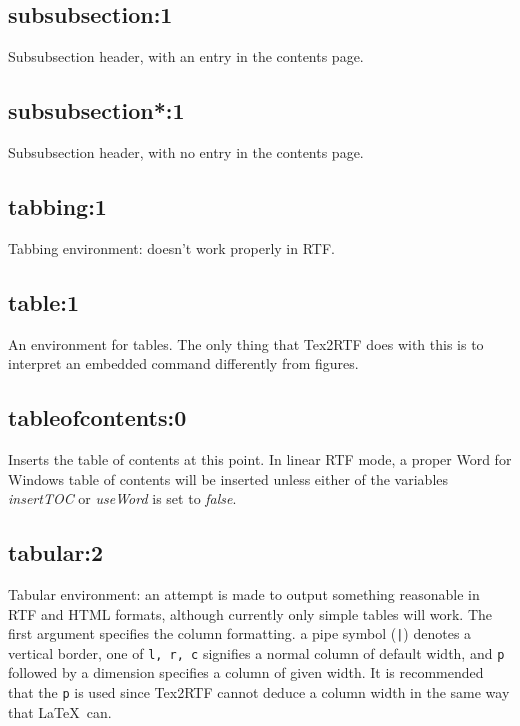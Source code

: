 \subsection*{subsubsection:1}\label{subsubsection}

Subsubsection header, with an entry in the contents page. 

\subsection*{subsubsection*:1}\label{subsubsectionX}

Subsubsection header, with no entry in the contents page. 

\subsection*{tabbing:1}\label{tabbing}

Tabbing environment: doesn't work properly in RTF.

\subsection*{table:1}\label{table}

An environment for tables. The only thing that Tex2RTF does with this
is to interpret an embedded  command differently
from figures.

\subsection*{tableofcontents:0}\label{tableofcontents}

Inserts the table of contents at this point. In linear RTF mode, a
proper Word for Windows table of contents will be inserted unless either
of the variables {\it insertTOC} or {\it useWord} is set to {\it false}.

\subsection*{tabular:2}\label{tabular}

Tabular environment: an attempt is made to output something
reasonable in RTF and HTML formats, although currently only simple
tables will work. The first argument specifies the column formatting.
a pipe symbol (\verb$|$) denotes a vertical border, one of {\tt l, r, c}\rtfsp
signifies a normal column of default width, and {\tt p} followed by
a dimension specifies a column of given width. It is recommended that
the {\tt p} is used since Tex2RTF cannot deduce a column width in the
same way that \LaTeX\ can.

